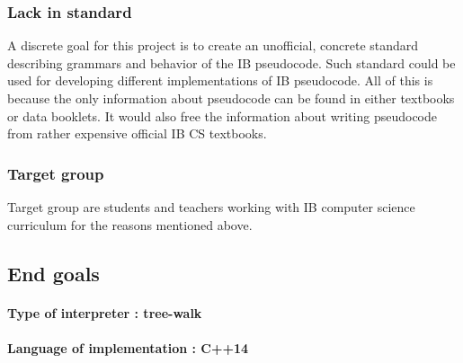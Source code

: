 \documentclass[12pt]{article}
\begin{document}
\subsubsection*{Lack in standard}
A discrete goal for this project is to create an unofficial, concrete standard describing
grammars and behavior of the IB pseudocode. Such standard could be used for developing
different implementations of IB pseudocode. All of this is because the only information
about pseudocode can be found in either textbooks or data booklets. It would also free the information
about writing pseudocode from rather expensive official IB CS textbooks.
\subsubsection*{Target group}
Target group are students and teachers working with IB computer science curriculum for
the reasons mentioned above. 

\subsection{End goals}
\paragraph{Type of interpreter : tree-walk}
\paragraph{Language of implementation : C++14}
\end{document}
